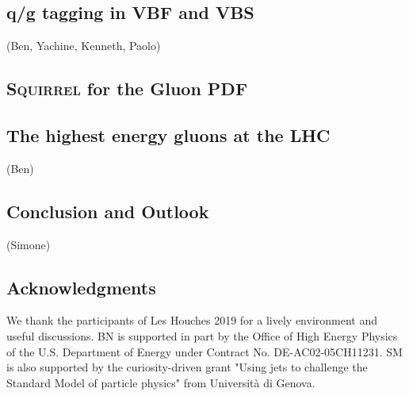 \documentclass[11pt]{cernrep}
\begin{document}




\subsection{q/g tagging in VBF and VBS}
\label{sec:jets:vbsbvf}
(Ben, Yachine, Kenneth, Paolo)



\subsection{\textsc{Squirrel} for the Gluon PDF}
\label{sec:jets:pdf}



\subsection{The highest energy gluons at the LHC}
\label{sec:jets:highest}
(Ben)

\subsection{Conclusion and Outlook}
\label{sec:jets:conclusion}
(Simone)

\subsection*{Acknowledgments}

We thank the participants of Les Houches 2019 for a lively environment and useful discussions.
BN is supported in part by the Office of High Energy Physics of the U.S. Department of Energy under Contract No. DE-AC02-05CH11231.
%
SM is also supported by the curiosity-driven grant "Using jets to challenge the Standard Model of particle physics" from Universit\`a di Genova.


\end{document}
